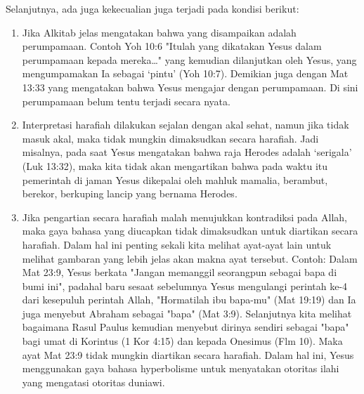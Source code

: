 Selanjutnya, ada juga kekecualian juga terjadi pada kondisi berikut:
\begin{enumerate}
\item Jika Alkitab jelas mengatakan bahwa yang disampaikan adalah perumpamaan. Contoh Yoh 10:6 "Itulah yang dikatakan Yesus dalam perumpamaan kepada mereka…" yang kemudian dilanjutkan oleh Yesus, yang mengumpamakan Ia sebagai ‘pintu’ (Yoh 10:7). Demikian juga dengan Mat 13:33 yang mengatakan bahwa Yesus mengajar dengan perumpamaan. Di sini perumpamaan belum tentu terjadi secara nyata.
\item Interpretasi harafiah dilakukan sejalan dengan akal sehat, namun jika tidak masuk akal, maka tidak mungkin dimaksudkan secara harafiah. Jadi misalnya, pada saat Yesus mengatakan bahwa raja Herodes adalah ‘serigala’ (Luk 13:32), maka kita tidak akan mengartikan bahwa pada waktu itu pemerintah di jaman Yesus dikepalai oleh mahluk mamalia, berambut, berekor, berkuping lancip yang bernama Herodes.
\item Jika pengartian secara harafiah malah menujukkan kontradiksi pada Allah, maka gaya bahasa yang diucapkan tidak dimaksudkan untuk diartikan secara harafiah. Dalam hal ini penting sekali kita melihat ayat-ayat lain untuk melihat gambaran yang lebih jelas akan makna ayat tersebut. Contoh: Dalam Mat 23:9, Yesus berkata "Jangan memanggil seorangpun sebagai bapa di bumi ini", padahal baru sesaat sebelumnya Yesus mengulangi perintah ke-4 dari kesepuluh perintah Allah, "Hormatilah ibu bapa-mu" (Mat 19:19) dan Ia juga menyebut Abraham sebagai "bapa" (Mat 3:9). Selanjutnya kita melihat bagaimana Rasul Paulus kemudian menyebut dirinya sendiri sebagai "bapa" bagi umat di Korintus (1 Kor 4:15) dan kepada Onesimus (Flm 10). Maka ayat Mat 23:9 tidak mungkin diartikan secara harafiah. Dalam hal ini, Yesus menggunakan gaya bahasa hyperbolisme untuk menyatakan otoritas ilahi yang mengatasi otoritas duniawi.
\end{enumerate}

